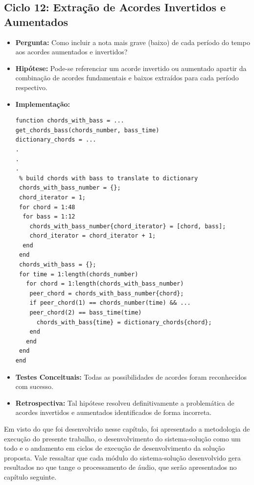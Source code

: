 \subsection{Ciclo 12: Extração de Acordes Invertidos e Aumentados}
\label{subsec:ciclo_12}
\begin{itemize}
\item \textbf{Pergunta:} Como incluir a nota mais grave (baixo) de cada período do tempo aos acordes aumentados e invertidos?
\item \textbf{Hipótese:} Pode-se referenciar um acorde invertido ou aumentado apartir da combinação de acordes fundamentais e baixos extraídos para cada período respectivo.
\item \textbf{Implementação:}
\begin{lstlisting}
function chords_with_bass = ...
get_chords_bass(chords_number, bass_time)
dictionary_chords = ...
.
.
.
 % build chords with bass to translate to dictionary
 chords_with_bass_number = {};
 chord_iterator = 1;
 for chord = 1:48
  for bass = 1:12
    chords_with_bass_number{chord_iterator} = [chord, bass];
    chord_iterator = chord_iterator + 1;
  end
 end
 chords_with_bass = {};
 for time = 1:length(chords_number)
   for chord = 1:length(chords_with_bass_number)
    peer_chord = chords_with_bass_number{chord};
    if peer_chord(1) == chords_number(time) && ...
    peer_chord(2) == bass_time(time)
      chords_with_bass{time} = dictionary_chords{chord};
    end
   end
 end
end
\end{lstlisting}
\item \textbf{Testes Conceituais:} Todas as possibilidades de acordes foram reconhecidos com sucesso.
\item \textbf{Retrospectiva:} Tal hipótese resolveu definitivamente a problemática de acordes invertidos e aumentados identificados de forma incorreta.
\end{itemize}

Em visto do que foi desenvolvido nesse capítulo, foi apresentado a metodologia de execução do presente trabalho, o desenvolvimento do sistema-solução como um todo e o andamento em ciclos de execução de desenvolvimento da solução proposta. Vale ressaltar que cada módulo do sistema-solução desenvolvido gera resultados no que tange o processamento de áudio, que serão apresentados no capítulo seguinte. 